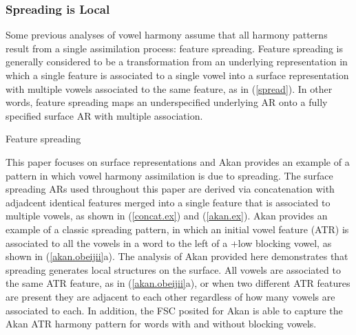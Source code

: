 \documentclass[,doc,floatsintext]{apa6}
\theoremstyle{definition}
\theoremstyle{definition}
\theoremstyle{definition}
\theoremstyle{remark}
\begin{document}
\subsubsection{Spreading is Local}\label{spreading-is-local}

Some previous analyses of vowel harmony assume that all harmony patterns
result from a single assimilation process: feature spreading. Feature
spreading is generally considered to be a transformation from an
underlying representation in which a single feature is associated to a
single vowel into a surface representation with multiple vowels
associated to the same feature, as in (\ref{spread}). In other words,
feature spreading maps an underspecified underlying AR onto a fully
specified surface AR with multiple association.

\begin{exe}
\ex Feature spreading \label{spread} \\
\end{exe}

This paper focuses on surface representations and Akan provides an
example of a pattern in which vowel harmony assimilation is due to
spreading. The surface spreading ARs used throughout this paper are
derived via concatenation with adjadcent identical features merged into
a single feature that is associated to multiple vowels, as shown in
(\ref{concat.ex}) and (\ref{akan.ex}). Akan provides an example of a
classic spreading pattern, in which an initial vowel feature (ATR) is
associated to all the vowels in a word to the left of a +low blocking
vowel, as shown in (\ref{akan.obeijii}a). The analysis of Akan provided
here demonstrates that spreading generates local structures on the
surface. All vowels are associated to the same ATR feature, as in
(\ref{akan.obeijii}a), or when two different ATR features are present
they are adjacent to each other regardless of how many vowels are
associated to each. In addition, the FSC posited for Akan is able to
capture the Akan ATR harmony pattern for words with and without blocking
vowels.
\end{document}
